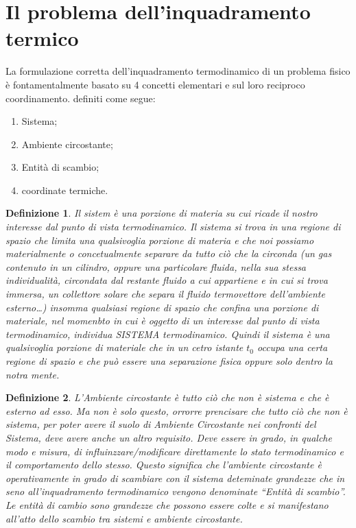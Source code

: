 \documentclass{book}
\newtheorem{defi}{Definizione}
\begin{document}
\section{Il problema dell'inquadramento termico\label{pro.inq.term}}
La formulazione corretta dell'inquadramento termodinamico di un problema fisico è fontamentalmente basato su 4
concetti elementari e sul loro reciproco coordinamento. definiti come segue:
\begin{enumerate}
\item Sistema;
\item Ambiente circostante;
\item Entità di scambio;
\item coordinate termiche.
\end{enumerate}
\begin{defi}
  Il sistem è una porzione di materia su cui ricade il nostro interesse dal punto di vista termodinamico.
  Il sistema si trova in una regione di spazio che limita una qualsivoglia porzione di materia e che noi possiamo
  materialmente o concetualmente separare da tutto ciò che la circonda (un gas contenuto in un cilindro,
  oppure una particolare fluida, nella sua stessa individualità, circondata dal restante fluido a cui appartiene
  e in cui si trova immersa, un collettore solare che separa il fluido termovettore dell'ambiente esterno\dots)
  insomma qualsiasi regione di spazio che confina una porzione di materiale, nel momenbto in cui è oggetto di un
  interesse dal punto di vista termodinamico, individua SISTEMA termodinamico. Quindi il sistema è una
  qualsivoglia porzione di materiale che in un cetro istante $t_0$ occupa una certa regione di spazio e che può
  essere una separazione fisica oppure solo dentro la notra mente.  
\end{defi}
\begin{defi}
  L'Ambiente circostante è tutto ciò che non è sistema e che è esterno ad esso. Ma non è solo questo, orrorre
  prencisare che tutto ciò che non è sistema, per poter avere il suolo di {\it Ambiente Circostante} nei
  confronti del Sistema, deve avere anche un altro requisito. Deve essere in grado, in qualche modo e misura,
  di influinzzare/modificare direttamente lo stato termodinamico e il comportamento dello stesso. Questo
  significa che l'ambiente circostante è operativamente in grado di scambiare con il sistema deteminate grandezze
  che in seno all'inquadramento termodinamico vengono denominate ``Entità di scambio''. Le entità di cambio sono
  grandezze che possono essere colte e si manifestano all'atto dello scambio tra sistemi e ambiente circostante.
\end{defi}
\end{document}

